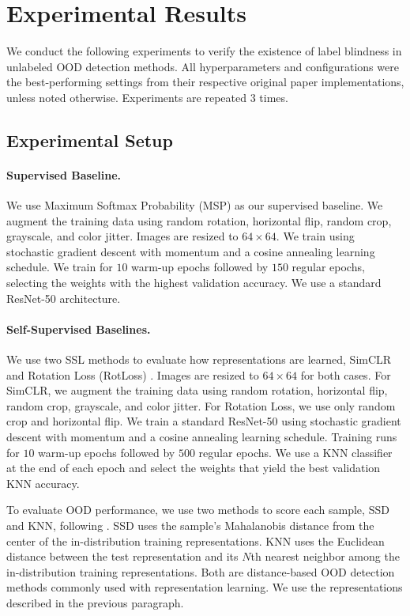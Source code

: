 \section{Experimental Results}

We conduct the following experiments to verify the existence of label blindness in unlabeled OOD detection methods. All hyperparameters and configurations were the best-performing settings from their respective original paper implementations, unless noted otherwise. Experiments are repeated $3$ times.

\subsection{Experimental Setup}

\paragraph{Supervised Baseline.}
We use Maximum Softmax Probability (MSP) \citep{hendrycks2016baseline} as our supervised baseline. We augment the training data using random rotation, horizontal flip, random crop, grayscale, and color jitter. Images are resized to $64\times64$. We train using stochastic gradient descent with momentum and a cosine annealing learning schedule. We train for $10$ warm-up epochs followed by $150$ regular epochs, selecting the weights with the highest validation accuracy. We use a standard ResNet-50 architecture.

\paragraph{Self-Supervised Baselines.}
We use two SSL methods to evaluate how representations are learned, SimCLR \citep{chen2020simple} and Rotation Loss (RotLoss) \citep{hendrycks2019using}. Images are resized to $64\times64$ for both cases. For SimCLR, we augment the training data using random rotation, horizontal flip, random crop, grayscale, and color jitter. For Rotation Loss, we use only random crop and horizontal flip. We train a standard ResNet-50 using stochastic gradient descent with momentum and a cosine annealing learning schedule. Training runs for $10$ warm-up epochs followed by $500$ regular epochs. We use a KNN classifier at the end of each epoch and select the weights that yield the best validation KNN accuracy.

To evaluate OOD performance, we use two methods to score each sample, SSD \citep{sehwag2021ssd} and KNN, following \citet{sun2022out}. SSD uses the sample's Mahalanobis distance from the center of the in-distribution training representations. KNN uses the Euclidean distance between the test representation and its $N$th nearest neighbor among the in-distribution training representations. Both are distance-based OOD detection methods commonly used with representation learning. We use the representations described in the previous paragraph.

